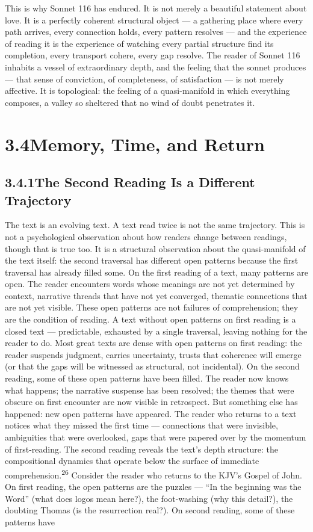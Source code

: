 This is why Sonnet 116 has endured. It is not merely a beautiful statement about love. It is a perfectly coherent structural object — a gathering place where every path arrives, every connection holds, every pattern resolves — and the experience of reading it is the experience of watching every partial structure find its completion, every transport cohere, every gap resolve. The reader of Sonnet 116 inhabits a vessel of extraordinary depth, and the feeling that the sonnet produces — that sense of conviction, of completeness, of satisfaction — is not merely affective. It is topological: the feeling of a quasi-manifold in which everything composes, a valley so sheltered that no wind of doubt penetrates it.

\section{3.4\quad Memory, Time, and Return}

\subsection{3.4.1\quad The Second Reading Is a Different Trajectory}

The text is an evolving text. A text read twice is not the same trajectory. This is not a psychological observation about how readers change between readings, though that is true too. It is a structural observation about the quasi-manifold of the text itself: the second traversal has different open patterns because the first traversal has already filled some. On the first reading of a text, many patterns are open. The reader encounters words whose meanings are not yet determined by context, narrative threads that have not yet converged, thematic connections that are not yet visible. These open patterns are not failures of comprehension; they are the condition of reading. A text without open patterns on first reading is a closed text — predictable, exhausted by a single traversal, leaving nothing for the reader to do. Most great texts are dense with open patterns on first reading: the reader suspends judgment, carries uncertainty, trusts that coherence will emerge (or that the gaps will be witnessed as structural, not incidental). On the second reading, some of these open patterns have been filled. The reader now knows what happens; the narrative suspense has been resolved; the themes that were obscure on first encounter are now visible in retrospect. But something else has happened: new open patterns have appeared. The reader who returns to a text notices what they missed the first time — connections that were invisible, ambiguities that were overlooked, gaps that were papered over by the momentum of first-reading. The second reading reveals the text’s depth structure: the compositional dynamics that operate below the surface of immediate comprehension.\textsuperscript{26} Consider the reader who returns to the KJV’s Gospel of John. On first reading, the open patterns are the puzzles — “In the beginning was the Word” (what does logos mean here?), the foot-washing (why this detail?), the doubting Thomas (is the resurrection real?). On second reading, some of these patterns have

